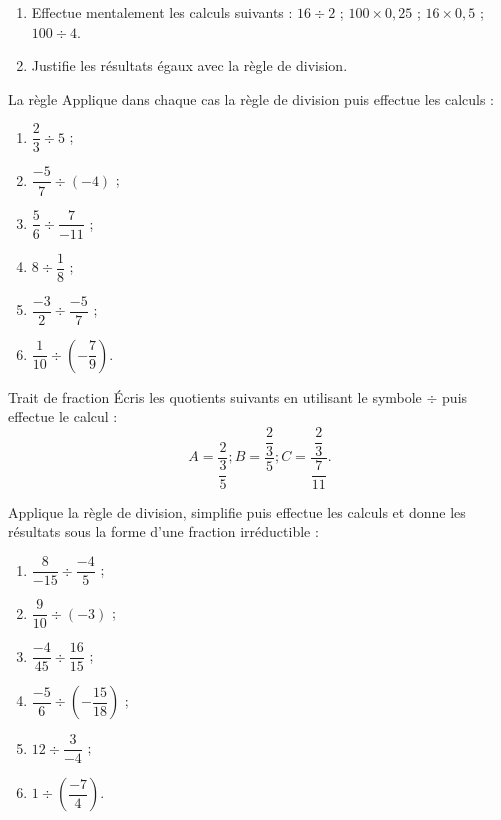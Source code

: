 \begin{exercice}[Mentalement]
\begin{enumerate}
\item Effectue mentalement les calculs suivants : $16 \div 2$ ; $100 \times 0,25$ ; $16 \times 0,5$ ; $100 \div 4$.
\item Justifie les résultats égaux avec la règle de division.
\end{enumerate}
\end{exercice}


\begin{exercice}La règle
Applique dans chaque cas la règle de division puis effectue les calculs :
\begin{enumerate}
\item $\dfrac{2}{3} \div 5$ ; 
\item $\dfrac{-5}{7} \div (-4)$ ;
\item $\dfrac{5}{6} \div \dfrac{7}{-11}$ ;
\item $8 \div \dfrac{1}{8}$ ;
\item $\dfrac{-3}{2} \div \dfrac{-5}{7}$ ;
\item $\dfrac{1}{10} \div \left(-\dfrac{7}{9}\right)$.
\end{enumerate}
\end{exercice}

\begin{exercice}Trait de fraction
Écris les quotients suivants en utilisant le symbole $\div$ puis effectue le calcul :
\[ A = \dfrac{2}{\dfrac{3}{5}}  ; B = \dfrac{\dfrac{2}{3}}{5} ; C = \dfrac{\dfrac{2}{3}}{\dfrac{7}{11}}.\]
\end{exercice}


\begin{exercice}
Applique la règle de division, simplifie puis effectue les calculs et donne les résultats sous la forme d'une fraction irréductible :
\begin{enumerate}
\item $\dfrac{8}{-15} \div \dfrac{-4}{5}$ ;
\item $\dfrac{9}{10} \div (-3)$ ;
\item $\dfrac{-4}{45} \div \dfrac{16}{15}$ ;
\item $\dfrac{-5}{6} \div \left(-\dfrac{15}{18}\right)$ ;
\item $12 \div \dfrac{3}{-4}$ ;
\item $1 \div \left(\dfrac{-7}{4}\right)$.
\end{enumerate}
\end{exercice}
